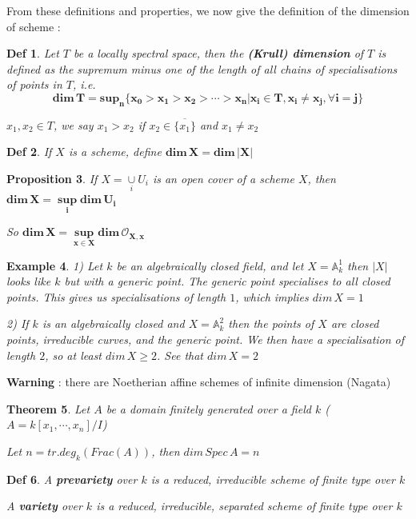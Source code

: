 \documentclass{article}
\newtheorem{theorem}{Theorem}[section]
\newtheorem{definition}[theorem]{Def}
\newtheorem{example}[theorem]{Example}
\newtheorem{proposition}[theorem]{Proposition}
\begin{document}
From these definitions and properties, we now give the definition of the dimension of scheme :

\begin{definition}
    Let $T$ be a locally spectral space, then the \textbf{(Krull) dimension} of $T$ is defined as the supremum minus one of the length of all chains of specialisations of points in $T$, i.e.
    $$
    \bm{
    dim\, T = sup_{n}
\{x_0 > x_1 > x_2 > \cdots > x_n | x_i \in T, x_i \ne x_j , \forall i = j\}
    }$$

    $x_1,x_2\in T$, we say $x_1>x_2$ if $x_2\in\overline{\{x_1\}}$ and $x_1\ne x_2$
\end{definition}

\begin{definition}
    If $X$ is a scheme, define $\bm{dim \,X = dim \,|X|}$
\end{definition}

\begin{proposition}
    If $X =\mathop{\cup}\limits_i U_i$ is an open cover of a scheme $X$, then $\bm{dim\, X = \mathop{sup}\limits_i dim\, U_i}$

    So $\bm{dim\, X = \mathop{sup}\limits_{x\in X} dim\, \mathcal O_{X,x}}$
\end{proposition}

\begin{example}
    1) Let $k$ be an algebraically closed field, and let $X =\mathbb A^1_k$
then $|X|$ looks like $k$ but with
a generic point. The generic point specialises to all closed points. This gives us specialisations of length
$1$, which implies $dim\, X = 1$

2) If $k$ is an algebraically closed and $X =\mathbb A^2_k$
then the points of $X$ are closed points,
irreducible curves, and the generic point. We then have a specialisation of length $2$, so at least $dim\, X \geq
2$. See that $dim\, X =
2$
\end{example}

\textbf{Warning} : there are Noetherian affine schemes of infinite dimension (Nagata)

\begin{theorem}
    Let $A$ be a domain finitely generated over a field $k$ ($A=k[x_1,\cdots,x_n]/I$)
    
    Let $n=tr.deg_k(Frac(A))$, then $dim\,Spec\, A=n$
\end{theorem}

\begin{definition}
    A \textbf{prevariety} over $k$ is a reduced, irreducible scheme of finite type over $k$
    
    A \textbf{variety} over $k$ is a reduced, irreducible, separated scheme of finite type over $k$
\end{definition}
\end{document}
